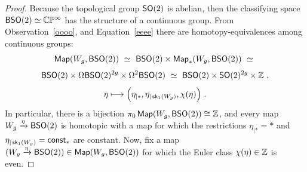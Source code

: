 \begin{proof}
Because the topological group ${\sf SO}(2)$ is abelian, then the classifying space ${\sf BSO}(2)\simeq \mathbb C\mathbb P^\infty$ has the structure of a continuous group.
From Observation~\ref{oooo}, and Equation~\ref{eeee} there are homotopy-equivalences among continuous groups:
\[
\operatorname{{\sf Map}}(W_g , {\sf BSO}(2))
~\simeq~
{\sf BSO}(2)
\times
\operatorname{{\sf Map}}_\ast(W_g , {\sf BSO}(2) )
~\simeq~
\]
\[
{\sf BSO}(2)
\times
\Omega {\sf BSO}(2)^{2g}
\times
\Omega^2 {\sf BSO}(2)
~\simeq~
{\sf BSO}(2)
\times
{\sf SO}(2)^{2g}
\times
\mathbb Z
~,
\]
\[
\eta
\longmapsto
\Bigl(
\eta_{|\ast}
,
\eta_{|\operatorname{\mathsf{sk}}_1(W_g)}
,
\chi(\eta)
\Bigr)
~.
\]
In particular, there is a bijection $\pi_0 \operatorname{{\sf Map}}(W_g , {\sf BSO}(2)) \cong \mathbb Z$, and every map $W_g \xrightarrow{\eta} {\sf BSO}(2)$ is homotopic with a map for which the restrictions $\eta_{|\ast} = \ast$ and $\eta_{|\operatorname{\mathsf{sk}}_1(W_g)} = {\sf const}_\ast$ are constant.  
Now, fix a map $(W_g \xrightarrow{\eta} {\sf BSO}(2)) \in \operatorname{{\sf Map}}( W_g , {\sf BSO}(2) )$ for which the Euler class $\chi(\eta)\in \mathbb Z$ is even.  




\end{proof}
